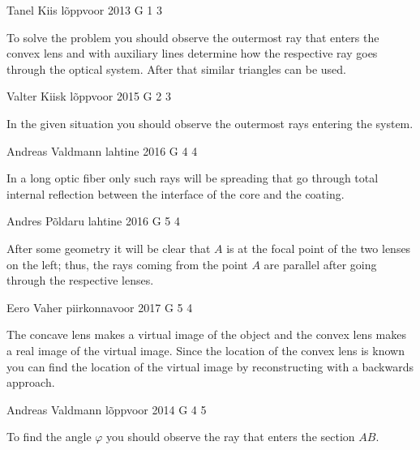 \documentclass[11pt]{article}
\begin{document}
{Tanel Kiis} %
{lõppvoor} %
{2013} %
{G 1} %
{3} %
{

\ifEngHint
To solve the problem you should observe the outermost ray that enters the convex lens and with auxiliary lines determine how the respective ray goes through the optical system. After that similar triangles can be used.
\fi
}

{Valter Kiisk} %
{lõppvoor} %
{2015} %
{G 2} %
{3} %
{

\ifEngHint
In the given situation you should observe the outermost rays entering the system.
\fi
}

{Andreas Valdmann} %
{lahtine} %
{2016} %
{G 4} %
{4} %
{

\ifEngHint
In a long optic fiber only such rays will be spreading that go through total internal reflection between the interface of the core and the coating.
\fi
}

{Andres Põldaru} %
{lahtine} %
{2016} %
{G 5} %
{4} %
{

\ifEngHint
After some geometry it will be clear that $A$ is at the focal point of the two lenses on the left; thus, the rays coming from the point $A$ are parallel after going through the respective lenses.
\fi
}

{Eero Vaher} %
{piirkonnavoor} %
{2017} %
{G 5} %
{4} %
{

\ifEngHint
The concave lens makes a virtual image of the object and the convex lens makes a real image of the virtual image. Since the location of the convex lens is known you can find the location of the virtual image by reconstructing with a backwards approach.
\fi
}

{Andreas Valdmann} %
{lõppvoor} %
{2014} %
{G 4} %
{5} %
{

\ifEngHint
To find the angle $\varphi$ you should observe the ray that enters the section $AB$.
\fi
}
\end{document}
